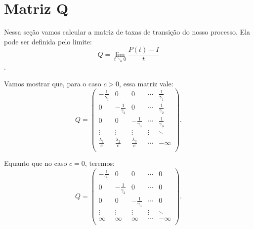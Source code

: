
\section{Matriz Q}
\label{sec:matrizq}

Nessa seção vamos calcular a matriz de taxas de transição do nosso
processo. Ela pode ser definida pelo limite:
\begin{displaymath}
  Q = \lim_{t \searrow 0} \frac{P(t) - I}{t} 
\end{displaymath}.

Vamos mostrar que, para o caso $c > 0$, essa matriz vale:
\begin{displaymath}
  Q = \left(
    \begin{array}{ccccc}
      -\frac{1}{\gamma_1} & 0 & 0 & \cdots & \frac{1}{\gamma_1}\\
      0 & -\frac{1}{\gamma_2} & 0 & \cdots & \frac{1}{\gamma_2}\\
      0 & 0 & -\frac{1}{\gamma_3} & \cdots & \frac{1}{\gamma_3}\\
      \vdots & \vdots & \vdots & \vdots & \ddots \\
      \frac{\lambda_1}{c} & \frac{\lambda_2}{c} &
      \frac{\lambda_3}{c} & \cdots & -\infty\\
    \end{array}
  \right).
\end{displaymath}

Equanto que no caso $c=0$, teremos:
\begin{displaymath}
  Q = \left(
    \begin{array}{ccccc}
      -\frac{1}{\gamma_1} & 0 & 0 & \cdots & 0\\
      0 & -\frac{1}{\gamma_2} & 0 & \cdots & 0\\
      0 & 0 & -\frac{1}{\gamma_3} & \cdots & 0\\
      \vdots & \vdots & \vdots & \vdots & \ddots \\
      \infty & \infty & \infty & \cdots & -\infty\\
    \end{array}
  \right).
\end{displaymath}

